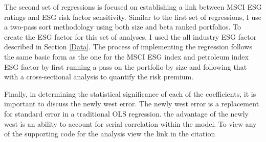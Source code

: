 The second set of regressions is focused on establishing a link between MSCI ESG ratings and ESG risk factor sensitivity. Similar to the first set of regressions, I use a two-pass sort methodology using both size and beta ranked portfolios. To create the ESG factor for this set of analyses, I used the all industry ESG factor described in Section \ref{Data}. The process of implementing the regression follows the same basic form as the one for the MSCI ESG index and petroleum index ESG factor by first running a pass on the portfolio by size and following that with a cross-sectional analysis to quantify the risk premium. 

Finally, in determining the statistical significance of each of the coefficients, it is important to discuss the newly west error. The newly west error is a replacement for standard error in a traditional OLS regression. the advantage of the newly west is an ability to account for serial correlation within the model. To view any of the supporting code for the analysis view the link in the citation \cite{Matt_code}
